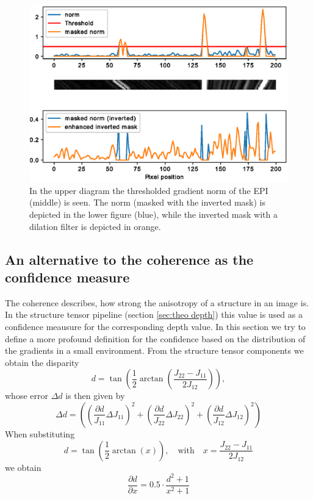 \documentclass  [
  paper    = a4,
  BCOR     = 10mm,
  twoside,
  fontsize = 12pt,
  fleqn,
  toc      = bibnumbered,
  toc      = listofnumbered,
  numbers  = noendperiod,
  headings = normal,
  listof   = leveldown,
  version  = 3.03
]                                       {scrreprt}
\begin{document}
\begin{figure}
	\centering
	\includegraphics[width=1\linewidth]{images/segm_gaussian}
	\caption[Enhanced segmentation mask]{In the upper diagram the thresholded gradient norm of the EPI (middle) is seen. The norm (masked with the inverted mask) is depicted in the lower figure (blue), while the inverted mask with a dilation filter is depicted in orange.}
	\label{fig:segmgaussian}
\end{figure}


 
 \subsection{An alternative to the coherence as the confidence measure}
 The coherence describes, how strong the anisotropy of a structure in an image is. In the structure tensor pipeline (section \ref{sec:theo depth}) this value is used as a confidence meausure for the corresponding depth value. In this section we try to define a more profound definition for the confidence based on the distribution of the gradients in a small environment.
 From the structure tensor components we obtain the disparity 
 \begin{equation}\label{eq:disparity2}
 d = \tan\left(\frac{1}{2} \arctan\left( \frac{J_{22}-J_{11}}{2J_{12}}\right)\right),
 \end{equation}
 whose error $\Delta d$ is then given by
 \begin{equation}\label{key}
 \Delta d = \left(\left(\frac{\partial d}{J_{11}}  \Delta J_{11}\right)^2 + \left(\frac{\partial d}{J_{22}}  \Delta J_{22}\right)^2 + \left(\frac{\partial d}{J_{12}} \Delta J_{12}\right)^2 \right)
 \end{equation}
 When substituting
 \begin{equation}\label{eq:disparity2}
 d = \tan\left(\frac{1}{2} \arctan\left( x\right)\right),\quad \text{with}\quad  x = \frac{J_{22}-J_{11}}{2J_{12}}
 \end{equation}
 we obtain
 \begin{equation}\label{key}
 \frac{\partial d}{\partial x} = 0.5\cdot \frac{d^2+1}{x^2+1}
 \end{equation}
 
\end{document}
